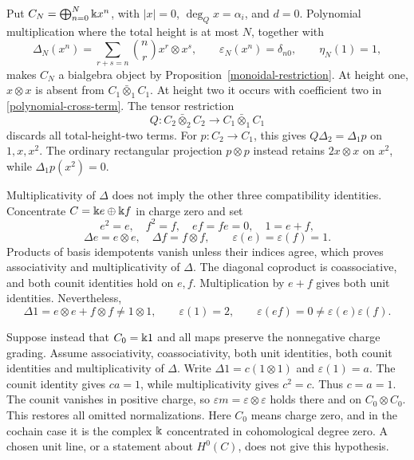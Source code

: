 \begin{remark}\label{polynomial-window}
Put $C_N=\bigoplus_{n=0}^N\Bbbk x^n$, with $|x|=0$,
$\deg_Qx=\alpha_i$, and $d=0$.  Polynomial multiplication where the total
height is at most $N$, together with
\[
 \Delta_N(x^n)=\sum_{r+s=n}\binom nr x^r\otimes x^s,
 \qquad \varepsilon_N(x^n)=\delta_{n0},\qquad \eta_N(1)=1,
\]
makes $C_N$ a bialgebra object by
Proposition~\ref{monoidal-restriction}.
At height one, $x\otimes x$ is absent from $C_1\bar\otimes_1C_1$.
At height two it occurs with coefficient two in
\eqref{polynomial-cross-term}.  The tensor restriction
\[
 Q:C_2\bar\otimes_2C_2\longrightarrow C_1\bar\otimes_1C_1
\]
discards all total-height-two terms.  For $p:C_2\to C_1$, this gives
$Q\Delta_2=\Delta_1p$ on $1,x,x^2$.
The ordinary rectangular projection $p\otimes p$ instead retains
$2x\otimes x$ on $x^2$, while $\Delta_1p(x^2)=0$.
\end{remark}

\begin{remark}\label{unit-normalization}
Multiplicativity of $\Delta$ does not imply the other three compatibility
identities.  Concentrate $C=\Bbbk e\oplus\Bbbk f$ in charge zero and set
\[
 e^2=e,\quad f^2=f,\quad ef=fe=0,\quad 1=e+f,
\]
\[
 \Delta e=e\otimes e,\quad \Delta f=f\otimes f,
 \qquad\varepsilon(e)=\varepsilon(f)=1.
\]
Products of basis idempotents vanish unless their indices agree, which
proves associativity and multiplicativity of $\Delta$.
The diagonal coproduct is coassociative, and both counit identities hold
on $e,f$.  Multiplication by $e+f$ gives both unit identities.  Nevertheless,
\[
 \Delta1=e\otimes e+f\otimes f\neq1\otimes1,\qquad
 \varepsilon(1)=2,\qquad
 \varepsilon(ef)=0\neq\varepsilon(e)\varepsilon(f).
\]

Suppose instead that $C_0=\Bbbk1$ and all maps preserve the nonnegative
charge grading.  Assume associativity, coassociativity, both unit
identities, both counit identities and multiplicativity of $\Delta$.
Write $\Delta1=c(1\otimes1)$ and $\varepsilon(1)=a$.
The counit identity gives $ca=1$, while multiplicativity gives $c^2=c$.
Thus $c=a=1$.  The counit vanishes in positive charge, so
$\varepsilon m=\varepsilon\otimes\varepsilon$ holds there and on
$C_0\otimes C_0$.  This restores all omitted normalizations.
Here $C_0$ means charge zero, and in the cochain case it is the complex
$\Bbbk$ concentrated in cohomological degree zero.
A chosen unit line, or a statement about $H^0(C)$, does not give this
hypothesis.
\end{remark}
